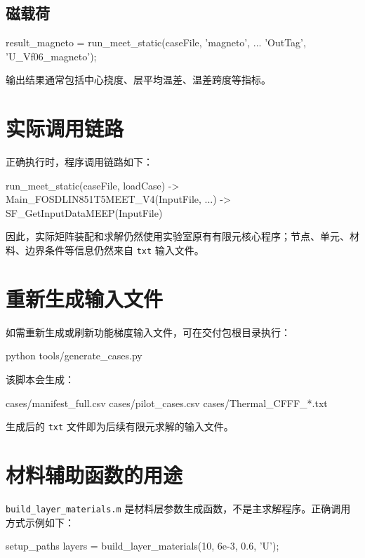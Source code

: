\documentclass[UTF8,fontset=windows]{ctexart}
\begin{document}
\subsection{磁载荷}

\begin{code}
result_magneto = run_meet_static(caseFile, 'magneto', ...
    'OutTag', 'U_Vf06_magneto');
\end{code}

输出结果通常包括中心挠度、层平均温差、温差跨度等指标。

\section{实际调用链路}

正确执行时，程序调用链路如下：

\begin{code}
run_meet_static(caseFile, loadCase)
    -> Main_FOSDLIN851T5MEET_V4(InputFile, ...)
        -> SF_GetInputDataMEEP(InputFile)
\end{code}

因此，实际矩阵装配和求解仍然使用实验室原有有限元核心程序；节点、单元、材料、边界条件等信息仍然来自 \texttt{txt} 输入文件。

\section{重新生成输入文件}

如需重新生成或刷新功能梯度输入文件，可在交付包根目录执行：

\begin{code}
python tools/generate_cases.py
\end{code}

该脚本会生成：

\begin{code}
cases/manifest_full.csv
cases/pilot_cases.csv
cases/Thermal_CFFF_*.txt
\end{code}

生成后的 \texttt{txt} 文件即为后续有限元求解的输入文件。

\section{材料辅助函数的用途}

\texttt{build\_layer\_materials.m} 是材料层参数生成函数，不是主求解程序。正确调用方式示例如下：

\begin{code}
setup_paths
layers = build_layer_materials(10, 6e-3, 0.6, 'U');
\end{code}
\end{document}
